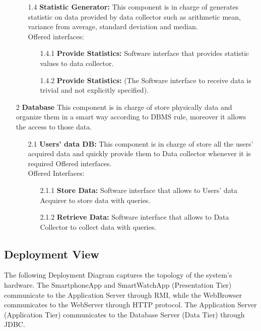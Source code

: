 \begin{enumerate}
\begin{enumerate}
	\item [1.4] \textbf{Statistic Generator:} This component is in charge of generates statistic on data provided by data collector such as arithmetic mean, variance from average, standard deviation and median.\\Offered interfaces:
		\begin{enumerate}
		\item [1.4.1] \textbf{Provide Statistics:} Software interface that provides statistic values to data collector.
		\item [1.4.2] \textbf{Provide Statistics:} (The Software interface to receive data is trivial and not explicitly specified).
		\end{enumerate}	
	\end{enumerate}
	
\item [2] \textbf{Database} 
This component is in charge of store physically data and organize them in a smart way according to DBMS rule, moreover it allows the access to those data.
	\begin{enumerate}
	\item [2.1]\textbf{Users’ data DB:}
	This component is in charge of store all the users’ acquired data and quickly provide them to Data collector whenever it is required
Offered interfaces. \\Offered Interfaces:
		\begin{enumerate}
		\item [2.1.1] \textbf{Store Data:} Software interface that allows to Users’ data Acquirer to store data with queries.
		\item [2.1.2] \textbf{Retrieve Data:} Software interface that allows to Data Collector to collect data with queries.
		\end{enumerate}	
	\end{enumerate}

\end{enumerate}


\subsection{Deployment View}
The following Deployment Diagram captures the topology of the system's hardware.
The SmartphoneApp and SmartWatchApp (Presentation Tier) communicate to the Application Server through RMI, while the WebBrowser communicates to the WebServer through HTTP protocol. The Application Server (Application Tier) communicates to the Database Server (Data Tier) through JDBC.

